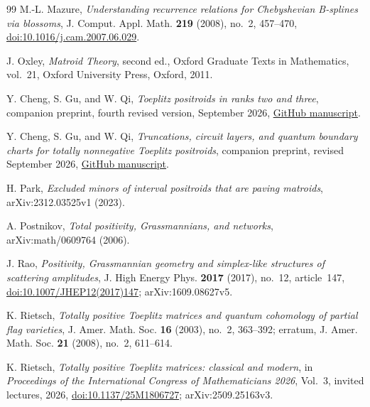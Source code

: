 \documentclass{amsart}
\numberwithin{equation}{section}
\theoremstyle{definition}
\theoremstyle{remark}
\begin{document}
\begin{thebibliography}{99}
M.-L. Mazure,
\emph{Understanding recurrence relations for Chebyshevian B-splines via blossoms},
J. Comput. Appl. Math. \textbf{219} (2008), no.~2, 457--470,
\href{https://doi.org/10.1016/j.cam.2007.06.029}{doi:10.1016/j.cam.2007.06.029}.

J. Oxley,
\emph{Matroid Theory}, second ed.,
Oxford Graduate Texts in Mathematics, vol.~21,
Oxford University Press, Oxford, 2011.

Y. Cheng, S. Gu, and W. Qi,
\emph{Toeplitz positroids in ranks two and three},
companion preprint, fourth revised version, September 2026,
\href{https://raw.githubusercontent.com/Cheng-Yaoyu/toeplitz-positroids-ranks-2-3-formalization/main/paper/toeplitz_positroids_ranks_2_3_fourth_revised.pdf}{GitHub manuscript}.

Y. Cheng, S. Gu, and W. Qi,
\emph{Truncations, circuit layers, and quantum boundary charts for totally nonnegative Toeplitz positroids},
companion preprint, revised September 2026,
\href{https://raw.githubusercontent.com/Cheng-Yaoyu/toeplitz-positroids-truncations-boundary-charts-formalization/main/paper/toeplitz_positroids_truncations_boundary_charts.pdf}{GitHub manuscript}.

H. Park,
\emph{Excluded minors of interval positroids that are paving matroids},
arXiv:2312.03525v1 (2023).

A. Postnikov,
\emph{Total positivity, Grassmannians, and networks},
arXiv:math/0609764 (2006).

J. Rao,
\emph{Positivity, Grassmannian geometry and simplex-like structures of scattering amplitudes},
J. High Energy Phys. \textbf{2017} (2017), no.~12, article~147,
\href{https://doi.org/10.1007/JHEP12(2017)147}{doi:10.1007/JHEP12(2017)147};
arXiv:1609.08627v5.

K. Rietsch,
\emph{Totally positive Toeplitz matrices and quantum cohomology of partial flag varieties},
J. Amer. Math. Soc. \textbf{16} (2003), no.~2, 363--392;
erratum, J. Amer. Math. Soc. \textbf{21} (2008), no.~2, 611--614.

K. Rietsch,
\emph{Totally positive Toeplitz matrices: classical and modern},
in \emph{Proceedings of the International Congress of Mathematicians 2026},
Vol.~3, invited lectures, 2026,
\href{https://doi.org/10.1137/25M1806727}{doi:10.1137/25M1806727};
arXiv:2509.25163v3.

\end{thebibliography}
\end{document}
